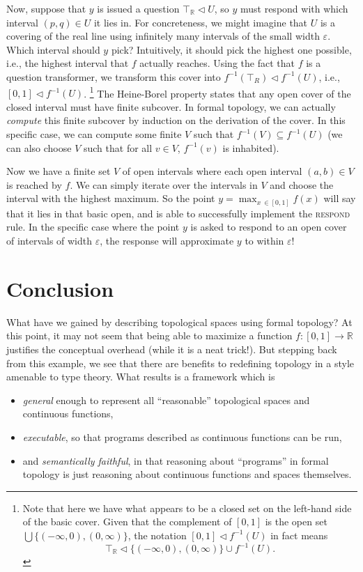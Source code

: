 \documentclass{article}
\newcommand{\cov}{\vartriangleleft}
\newcommand{\R}{\mathbb{R}}
\newcommand{\irule}[1]{\textsc{#1}}
\begin{document}
Now, suppose that $y$ is issued a question $\top_\R \cov U$, so $y$ must respond with which interval $(p, q) \in U$ it lies in. For concreteness, we might imagine that $U$ is a covering of the real line using infinitely many intervals of the small width $\varepsilon$. Which interval should $y$ pick? Intuitively, it should pick the highest one possible, i.e., the highest interval that $f$ actually reaches. Using the fact that $f$ is a question transformer, we transform this cover into $f^{-1}(\top_R) \cov f^{-1}(U)$, i.e., $[0, 1] \cov f^{-1}(U)$.
\footnote{Note that here we have what appears to be a closed set on the left-hand side of the basic cover. Given that the complement of $[0,1]$ is the open set $\bigcup \{(-\infty, 0), (0, \infty)\}$, the notation $[0,1] \cov f^{-1}(U)$ in fact means
\[
\top_\R \cov \{(-\infty, 0), (0, \infty)\} \cup f^{-1}(U).
\]
}
The Heine-Borel property states that any open cover of the closed interval must have finite subcover. In formal topology, we can actually \emph{compute} this finite subcover by induction on the derivation of the cover. In this specific case, we can compute some finite $V$ such that $f^{-1}(V) \subseteq f^{-1}(U)$ (we can also choose $V$ such that for all $v \in V$, $f^{-1}(v)$ is inhabited).

Now we have a finite set $V$ of open intervals where each open interval $(a, b) \in V$ is reached by $f$. We can simply iterate over the intervals in $V$ and choose the interval with the highest maximum. So the point $y = \max_{x\ \in [0,1]} f(x)$ will say that it lies in that basic open, and is able to successfully implement the \irule{respond} rule. In the specific case where the point $y$ is asked to respond to an open cover of intervals of width $\varepsilon$, the response will approximate $y$ to within $\varepsilon$!

\section{Conclusion}

What have we gained by describing topological spaces using formal topology? At this point, it may not seem that being able to maximize a function $f : [0, 1] \to \R$ justifies the conceptual overhead (while it is a neat trick!). But stepping back from this example, we see that there are benefits to redefining topology in a style amenable to type theory. What results is a framework which is
\begin{itemize}
\item \emph{general} enough to represent all ``reasonable''  topological spaces and continuous functions,
\item \emph{executable}, so that programs described as continuous functions can be run,
\item and \emph{semantically faithful}, in that reasoning about ``programs'' in formal topology is just reasoning about continuous functions and spaces themselves.
\end{itemize}
\end{document}
